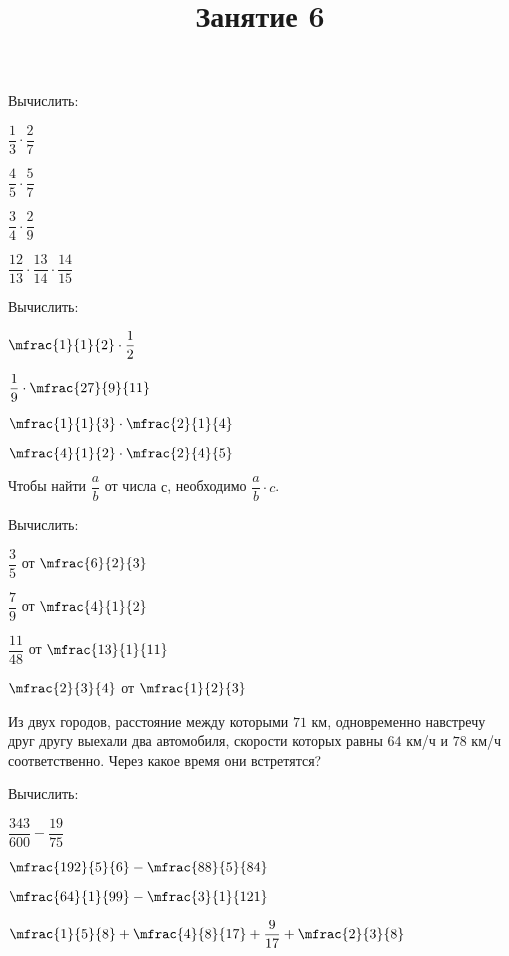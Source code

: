 \begin{listofex}[resume]
	\item Вычислить:
	\begin{enumcols}[itemcolumns=4]
		\item \( \dfrac{1}{3}\cdot\dfrac{2}{7} \)
		\item \( \dfrac{4}{5}\cdot\dfrac{5}{7} \)
		\item \( \dfrac{3}{4}\cdot\dfrac{2}{9} \)
		\item \( \dfrac{12}{13}\cdot\dfrac{13}{14}\cdot\dfrac{14}{15} \)
	\end{enumcols}
\end{listofex}
\begin{listofex}[resume]
	\item Вычислить:
	\begin{enumcols}[itemcolumns=4]
		\item \( \mfrac{1}{1}{2}\cdot\dfrac{1}{2} \)
		\item \( \dfrac{1}{9}\cdot\mfrac{27}{9}{11} \)
		\item \( \mfrac{1}{1}{3}\cdot\mfrac{2}{1}{4} \)
		\item \( \mfrac{4}{1}{2}\cdot\mfrac{2}{4}{5} \)
	\end{enumcols}
\end{listofex}
\begin{definit}
	Чтобы найти \( \dfrac{a}{b} \) от числа \( с \), необходимо \( \dfrac{a}{b}\cdot c \).
\end{definit}
\begin{listofex}[resume]
	\item Вычислить:
	\begin{enumcols}[itemcolumns=4]
		\item \( \dfrac{3}{5} \) от \( \mfrac{6}{2}{3} \)
		\item \( \dfrac{7}{9} \) от \( \mfrac{4}{1}{2} \)
		\item \( \dfrac{11}{48} \) от \( \mfrac{13}{1}{11} \)
		\item \( \mfrac{2}{3}{4} \) от \( \mfrac{1}{2}{3} \)
	\end{enumcols}
	\item Из двух городов, расстояние между которыми \( 71 \) км, одновременно навстречу друг другу
	выехали два автомобиля, скорости которых равны \( 64 \) км/ч и \( 78 \) км/ч соответственно. Через
	какое время они встретятся?
\end{listofex}
\newpage
\title{Занятие 6}
\begin{listofex}
	\item Вычислить:
	\begin{enumcols}[itemcolumns=4]
		\item \( \dfrac{343}{600}-\dfrac{19}{75} \)
		\item \( \mfrac{192}{5}{6}-\mfrac{88}{5}{84} \)
		\item \( \mfrac{64}{1}{99}-\mfrac{3}{1}{121} \)
		\item \( \mfrac{1}{5}{8}+\mfrac{4}{8}{17}+\dfrac{9}{17}+\mfrac{2}{3}{8} \)
	\end{enumcols}
\end{listofex}
